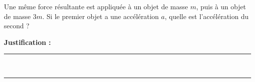 Une même force résultante est appliquée à un objet de masse $m$, puis à un objet de masse $3m$. Si le premier objet a une accélération $a$, quelle est l'accélération du second ?

\choices

\noindent\textbf{Justification :} \hrulefill \\[2.5ex]
\rule{\linewidth}{0.4pt} \\[2.5ex]
\rule{\linewidth}{0.4pt}
\vfill
